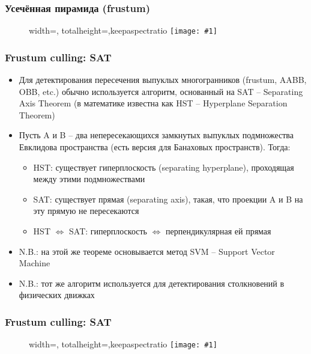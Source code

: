 \documentclass{beamer}
\newcommand{\slideimage}[1]{
  \begin{figure}
    \begin{adjustbox}{width=\textwidth, totalheight=\textheight-2\baselineskip-2\baselineskip,keepaspectratio}
      \texttt{[image: \#1]}
    \end{adjustbox}
  \end{figure}
}
\begin{document}
\begin{frame}[fragile]
\frametitle{Усечённая пирамида (frustum)}
\slideimage{frustum.png}
\end{frame}


\begin{frame}[fragile]
\frametitle{Frustum culling: SAT}
\begin{itemize}
\item Для детектирования пересечения выпуклых многогранников (frustum, AABB, OBB, etc.) обычно используется алгоритм, основанный на SAT -- Separating Axis Theorem (в математике известна как HST -- Hyperplane Separation Theorem)
\pause
\item Пусть A и B -- два непересекающихся замкнутых выпуклых подмножества Евклидова пространства (есть версия для Банаховых пространств). Тогда:
\pause
\begin{itemize}
\item HST: существует гиперплоскость (separating hyperplane), проходящая между этими подмножествами
\pause
\item SAT: существует прямая (separating axis), такая, что проекции A и B на эту прямую не пересекаются
\pause
\item HST \begin{math}\Leftrightarrow\end{math} SAT: гиперплоскость \begin{math}\Leftrightarrow\end{math} перпендикулярная ей прямая
\end{itemize}
\pause
\item N.B.: на этой же теореме основывается метод SVM -- Support Vector Machine
\item N.B.: тот же алгоритм используется для детектирования столкновений в физических движках
\end{itemize}
\end{frame}

\begin{frame}[fragile]
\frametitle{Frustum culling: SAT}
\slideimage{sat.png}
\end{frame}
\end{document}
